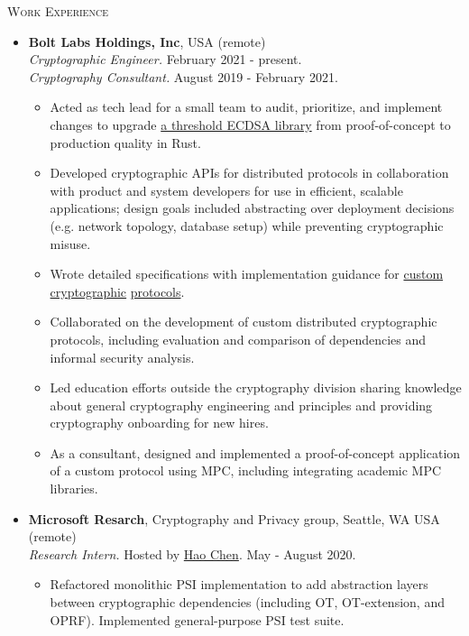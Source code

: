 \documentclass{article}
\begin{document}
\textsc{Work Experience}
\begin{itemize}[label={}, topsep=0pt]
  \item \textbf{Bolt Labs Holdings, Inc}, USA (remote) \\
  \textit{Cryptographic Engineer.} February 2021 - present.\\
  \textit{Cryptography Consultant.} August 2019 - February 2021.
  \begin{itemize}[leftmargin=*, noitemsep, topsep=0pt]
    \item Acted as tech lead for a small team to audit, prioritize, and implement changes to upgrade \href{https://github.com/boltlabs-inc/tss-ecdsa}{a threshold ECDSA library} from proof-of-concept to production quality in Rust.
    \item Developed cryptographic APIs for distributed protocols in collaboration with product and system developers for use in efficient, scalable applications; design goals included abstracting over deployment decisions (e.g. network topology, database setup) while preventing cryptographic misuse.
    \item Wrote detailed specifications with implementation guidance for \href{https://github.com/boltlabs-inc/key-mgmt-spec}{custom cryptographic} \href{https://github.com/boltlabs-inc/zkchannels-spec}{protocols}. 
    \item Collaborated on the development of custom distributed cryptographic protocols, including evaluation and comparison of dependencies and informal security analysis.
    \item Led education efforts outside the cryptography division sharing knowledge about general cryptography engineering and principles and providing cryptography onboarding for new hires.
    \item As a consultant, designed and implemented a proof-of-concept application of a custom protocol using MPC, including integrating academic MPC libraries.
  \end{itemize}
  \item \textbf{Microsoft Resarch}, Cryptography and Privacy group, Seattle, WA USA (remote)\\
  \textit{Research Intern.} Hosted by \href{https://haochenuw.github.io/}{Hao Chen}. May - August 2020.
  \begin{itemize}[leftmargin=*, noitemsep, topsep=0pt, partopsep=0pt]
    \item Refactored monolithic PSI implementation to add abstraction layers between cryptographic dependencies (including OT, OT-extension, and OPRF). Implemented general-purpose PSI test suite.

\end{itemize}
\end{itemize}
\end{document}

